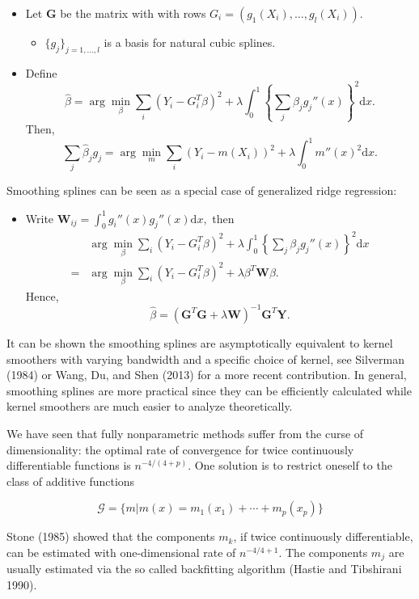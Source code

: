 \documentclass[
]{book}
\providecommand{\tightlist}{%
  \setlength{\itemsep}{0pt}\setlength{\parskip}{0pt}}
\begin{document}
\begin{itemize}
\tightlist
\item
  Let \(\mathbf G\) be the matrix with with rows \(G_i=(g_1(X_i), \dots, g_l(X_i))\).

  \begin{itemize}
  \tightlist
  \item
    \(\{g_j\}_{j=1,\dots,l}\) is a basis for natural cubic splines.
  \end{itemize}
\item
  Define
  \[
    \hat \beta  = \arg\min_{\beta} \sum_i (Y_i- G_i^T\beta)^2+\lambda\int_0^1 \left\{{\sum_j \beta_jg_j''}(x)\right\}^2\mathrm dx.
    \]
  Then,
  \[
    \sum_j \hat \beta_j g_j=\arg\min_{m} \sum_i (Y_i-m(X_i))^2+\lambda\int_0^1 m''(x)^2\mathrm dx.
    \]
\end{itemize}

Smoothing splines can be seen as a special case of generalized ridge regression:

\begin{itemize}
\tightlist
\item
  Write \(\mathbf W_{ij}=\int_0^1g_i''(x)g_j''(x)\mathrm dx,\) then
  \begin{align*}
    &\arg\min_{\beta} \sum_i (Y_i- G_i^T\beta)^2+\lambda\int_0^1 \left\{{\sum_j \beta_jg_j''}(x)\right\}^2\mathrm dx\\=
    &\arg\min_{\beta} \sum_i (Y_i- G_i^T\beta)^2+\lambda \beta^T \mathbf W \beta.
    \end{align*}
  Hence,
  \[
    \hat \beta= (\mathbf G^T\mathbf G+\lambda \mathbf W)^{-1}\mathbf G^T\mathbf Y.
    \]
\end{itemize}

It can be shown the smoothing splines are asymptotically equivalent to kernel smoothers with varying bandwidth and a specific choice of kernel, see Silverman (1984) or Wang, Du, and Shen (2013) for a more recent contribution. In general, smoothing splines are more practical since they can be efficiently calculated while kernel smoothers are much easier to analyze theoretically.

We have seen that fully nonparametric methods suffer from the curse of dimensionality: the optimal rate of convergence for twice continuously differentiable functions is \(n^{-4/(4+p)}\). One solution is to restrict oneself to the class of additive functions

\[
\mathcal G=\{m| m(x)=m_1(x_1)+\cdots +m_p(x_p)\}
\]

Stone (1985) showed that the components \(m_k\), if twice continuously differentiable, can be estimated with one-dimensional rate of \(n^{-4/4+1}\). The components \(m_j\) are usually estimated via the so called backfitting algorithm (Hastie and Tibshirani 1990).
\end{document}
